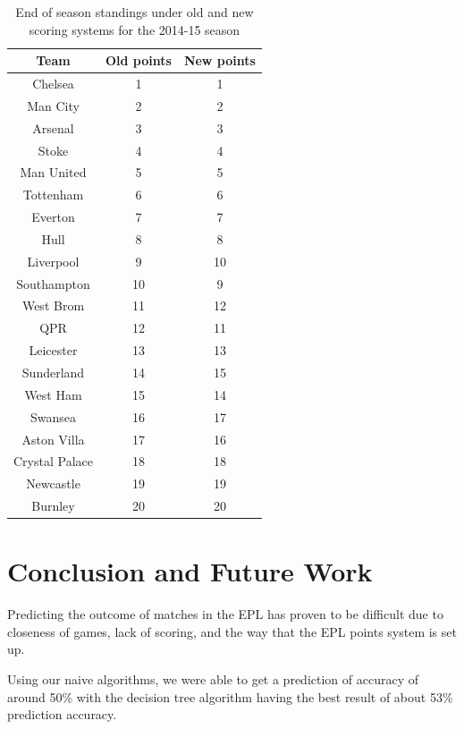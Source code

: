 \documentclass[conference]{IEEEtran}
\begin{document}
\begin{table} [h]
	\caption{End of season standings under old and new scoring systems for the 2014-15 season}
	\label{tab:standings}
	\begin{center}
		\begin{tabular}{@{} ccc @{}}
			\hline
			Team & Old points& New points \\ 
			\hline
			Chelsea  &  1  &  1 \\
			Man City  &  2  &  2 \\
			Arsenal  &  3  &  3 \\
			Stoke  &  4  &  4 \\
			Man United  &  5  &  5 \\
			Tottenham  &  6  &  6 \\
			Everton  &  7  &  7 \\
			Hull  &  8  &  8 \\
			Liverpool  &  9  &  10 \\
			Southampton  &  10  &  9 \\
			West Brom  &  11  &  12 \\
			QPR  &  12  &  11 \\
			Leicester  &  13  &  13 \\
			Sunderland  &  14  &  15 \\
			West Ham  &  15  &  14 \\
			Swansea  &  16  &  17 \\
			Aston Villa  &  17  &  16 \\
			Crystal Palace  &  18  &  18 \\
			Newcastle  &  19  &  19 \\
			Burnley  &  20  &  20 \\
			\hline
		\end{tabular}
	\end{center}
\end{table}

\section{Conclusion and Future Work}
Predicting the outcome of matches in the EPL has proven to be difficult due to closeness of games, lack of scoring, and the way that the EPL points system is set up. 

Using our naive algorithms, we were able to get a prediction of accuracy of around 50\% with the decision tree algorithm having the best result of about 53\% prediction accuracy. 
\end{document}
